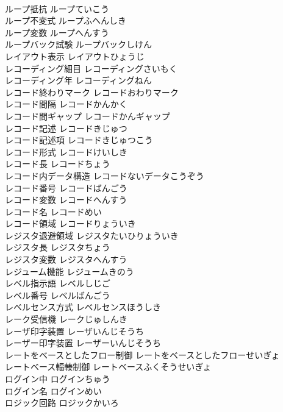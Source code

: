 \documentclass[8pt]{extreport}
\begin{document}
\begin{CJK}{UTF8}{min}
\\	ループ抵抗	ループていこう	
\\	ループ不変式	ループふへんしき	
\\	ループ変数	ループへんすう	
\\	ループバック試験	ループバックしけん	
\\	レイアウト表示	レイアウトひょうじ	
\\	レコーディング細目	レコーディングさいもく	
\\	レコーディング年	レコーディングねん	
\\	レコード終わりマーク	レコードおわりマーク	
\\	レコード間隔	レコードかんかく	
\\	レコード間ギャップ	レコードかんギャップ	
\\	レコード記述	レコードきじゅつ	
\\	レコード記述項	レコードきじゅつこう	
\\	レコード形式	レコードけいしき	
\\	レコード長	レコードちょう	
\\	レコード内データ構造	レコードないデータこうぞう	
\\	レコード番号	レコードばんごう	
\\	レコード変数	レコードへんすう	
\\	レコード名	レコードめい	
\\	レコード領域	レコードりょういき	
\\	レジスタ退避領域	レジスタたいひりょういき	
\\	レジスタ長	レジスタちょう	
\\	レジスタ変数	レジスタへんすう	
\\	レジューム機能	レジュームきのう	
\\	レベル指示語	レベルしじご	
\\	レベル番号	レベルばんごう	
\\	レベルセンス方式	レベルセンスほうしき	
\\	レーク受信機	レークじゅしんき	
\\	レーザ印字装置	レーザいんじそうち	
\\	レーザー印字装置	レーザーいんじそうち	
\\	レートをベースとしたフロー制御	レートをベースとしたフローせいぎょ	
\\	レートベース輻輳制御	レートベースふくそうせいぎょ	
\\	ログイン中	ログインちゅう	
\\	ログイン名	ログインめい	
\\	ロジック回路	ロジックかいろ	

\end{CJK}
\end{document}

